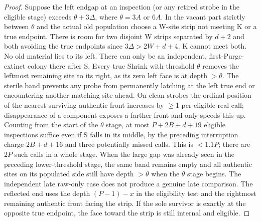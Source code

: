 \begin{proof}
Suppose the left endgap at an inspection (or any retired strobe in the eligible stage) exceeds \(\theta +3\Delta \), where \(\theta =3A\) or \(6A\). In the vacant part strictly between \(\theta\) and the actual old population choose a W-site strip not meeting K or a true endpoint. There is room for two disjoint W strips separated by \(d+2\) and both avoiding the true endpoints since \(3\Delta >2W+d+4\). K cannot meet both. No old material lies to its left. There can only be an independent, first-Purge-extinct colony there after S. Every true Shrink with threshold \(\theta\) removes the leftmost remaining site to its right, as its zero left face is at depth \(>\theta \). The sterile band prevents any probe from permanently latching at the left true end or encountering another matching site ahead. On clean strobes the ordinal position of the nearest surviving authentic front increases by \(\ge\)1 per eligible real call; disappearance of a component exposes a farther front and only speeds this up. Counting from the start of the \(\theta\) stage, at most \(P+2B+d+19\) eligible inspections suffice even if S falls in its middle, by the preceding interruption charge \(2B+d+16\) and three potentially missed calls. This is \(<1.1P\); there are \(2P\) such calls in a whole stage. When the large gap was already seen in the preceding lower-threshold stage, the same band remains empty and all authentic sites on its populated side still have depth \(>\theta \) when the \(\theta\) stage begins. The independent late raw-only case does not produce a genuine late comparison. The reflected end uses the depth \((P- 1)- x\) in the eligibility test and the rightmost remaining authentic front facing the strip. If the sole survivor is exactly at the opposite true endpoint, the face toward the strip is still internal and eligible.


\end{proof}
